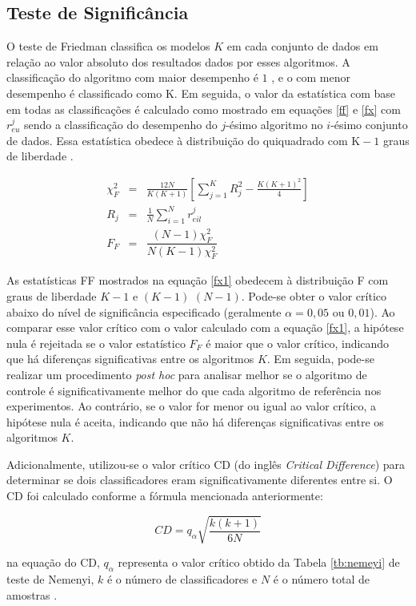  
 \subsection{Teste de Signific\^ancia}
 
 
 O teste de Friedman classifica os modelos $K$ em cada conjunto de dados em relação ao valor absoluto dos resultados dados por esses algoritmos. A classificação do algoritmo com maior desempenho é $1$ , e o com menor desempenho é classificado como $\mathrm{K}$. Em seguida, o valor da estatística com base em todas as classificações é calculado como mostrado em equações \eqref{ff} e \eqref{fx} com $r_{e u}^j$ sendo a classificação do desempenho do $j$-ésimo algoritmo no $i$-ésimo conjunto de dados. Essa estatística obedece à distribuição do quiquadrado com $\mathrm{K}-1$ graus de liberdade \cite{Liu2022}.
 
 \begin{eqnarray}
 	\chi_F^2 & =&\frac{12 N}{K(K+1)}\left[\sum_{j=1}^K R_j^2-\frac{K(K+1)^2}{4}\right] \label{ff}\\
 	R_j & =&\frac{1}{N} \sum_{i=1}^N r_{e i l}^j \label{fx}\\
 	F_F&=&\dfrac{(N-1) \chi_F^2}{N(K-1) \chi_F^2}\label{fx1}
 \end{eqnarray}
 
 
 As estatísticas FF mostrados na equação \eqref{fx1} obedecem à distribuição F com graus de liberdade $K-1$ e $(K-1)$ $(N-1)$. Pode-se obter o valor crítico abaixo do nível de significância especificado (geralmente $\alpha = 0,05$ ou $0,01$). Ao comparar esse valor crítico com o valor calculado com a equação \eqref{fx1}, a hipótese nula é rejeitada se o valor estatístico $F_F$ é maior que o valor crítico, indicando que há diferenças significativas entre os algoritmos $K$. Em seguida, pode-se realizar um procedimento \textit{post hoc} para analisar melhor se o algoritmo de controle é significativamente melhor do que cada algoritmo de referência nos experimentos. Ao contrário, se o valor for menor ou igual ao valor crítico, a hipótese nula é aceita, indicando que não há diferenças significativas entre os algoritmos $K$.
 
 
 Adicionalmente, utilizou-se o valor crítico CD (do inglês \textit{Critical Difference}) para determinar se dois classificadores eram significativamente diferentes entre si. O CD foi calculado conforme a fórmula mencionada anteriormente:
 
 \begin{equation}
 	CD = q_\alpha \sqrt{\frac{k(k+1)}{6N}}
 \end{equation}
 
 \noindent na equação do CD, $q_\alpha$ representa o valor crítico obtido da Tabela \ref{tb:nemeyi} de teste de Nemenyi, $k$ é o número de classificadores e $N$ é o número total de amostras \cite{Liu2022}.
 
 
 



